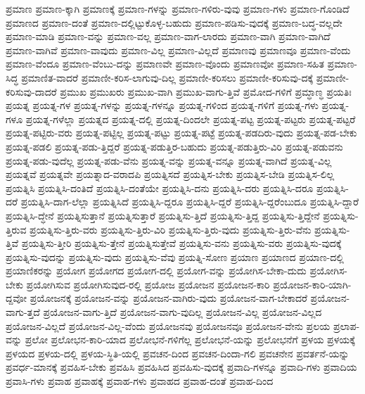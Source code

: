 {ಪ್ರಮಾಣ
ಪ್ರಮಾಣ-ಕ್ಕಾಗಿ
ಪ್ರಮಾಣಕ್ಕೆ
ಪ್ರಮಾಣ-ಗಳನ್ನು
ಪ್ರಮಾಣ-ಗಳಿರು-ವುವು
ಪ್ರಮಾಣ-ಗಳು
ಪ್ರಮಾಣ-ಗೊಂಡಿದೆ
ಪ್ರಮಾಣದ
ಪ್ರಮಾಣ-ದಂತೆ
ಪ್ರಮಾಣ-ದಲ್ಲಿಟ್ಟುಕೊಳ್ಳ-ಬಹುದು
ಪ್ರಮಾಣ-ಪಡಿಸು-ವುದಕ್ಕೆ
ಪ್ರಮಾಣ-ಬದ್ಧ-ವಲ್ಲದೇ
ಪ್ರಮಾಣ-ಮಾಡಿ
ಪ್ರಮಾಣ-ವನ್ನು
ಪ್ರಮಾಣ-ವಲ್ಲ
ಪ್ರಮಾಣ-ವಾಗ-ಲಾರದು
ಪ್ರಮಾಣ-ವಾಗಿ
ಪ್ರಮಾಣ-ವಾಗಿದೆ
ಪ್ರಮಾಣ-ವಾಗಿವೆ
ಪ್ರಮಾಣ-ವಾವುದು
ಪ್ರಮಾಣ-ವಿಲ್ಲ
ಪ್ರಮಾಣ-ವಿಲ್ಲದೆ
ಪ್ರಮಾಣವು
ಪ್ರಮಾಣವೂ
ಪ್ರಮಾಣ-ವೆಂದು
ಪ್ರಮಾಣ-ವೆಂದೂ
ಪ್ರಮಾಣ-ವೆಂಬು-ದನ್ನು
ಪ್ರಮಾಣವೇ
ಪ್ರಮಾಣ-ವೊಂದು
ಪ್ರಮಾಣವೋ
ಪ್ರಮಾಣ-ಸಹಿತ
ಪ್ರಮಾಣ-ಸಿದ್ಧ
ಪ್ರಮಾಣಿತ-ವಾದರೆ
ಪ್ರಮಾಣೀ-ಕರಿಸ-ಲಾಗುವು-ದಿಲ್ಲ
ಪ್ರಮಾಣೀ-ಕರಿಸಲು
ಪ್ರಮಾಣೀ-ಕರಿಸುವು-ದಕ್ಕೆ
ಪ್ರಮಾಣೀ-ಕರಿಸುವು-ದಾದರೆ
ಪ್ರಮುಖ
ಪ್ರಮುಖರು
ಪ್ರಮುಖ-ವಾಗಿ
ಪ್ರಮುಖ-ವಾಗು-ತ್ತಿವೆ
ಪ್ರಮೋದ-ಗಳಿಗೆ
ಪ್ರಮ್ಧಾಣ್ಧ
ಪ್ರಯತಿಃ
ಪ್ರಯತ್ನ
ಪ್ರಯತ್ನ-ಗಳ
ಪ್ರಯತ್ನ-ಗಳನ್ನು
ಪ್ರಯತ್ನ-ಗಳನ್ನೂ
ಪ್ರಯತ್ನ-ಗಳಿಂದ
ಪ್ರಯತ್ನ-ಗಳಿಗೆ
ಪ್ರಯತ್ನ-ಗಳು
ಪ್ರಯತ್ನ-ಗಳೂ
ಪ್ರಯತ್ನ-ಗಳೆಲ್ಲಾ
ಪ್ರಯತ್ನದ
ಪ್ರಯತ್ನ-ದಲ್ಲಿ
ಪ್ರಯತ್ನ-ದಿಂದಲೇ
ಪ್ರಯತ್ನ-ಪಟ್ಟ
ಪ್ರಯತ್ನ-ಪಟ್ಟರು
ಪ್ರಯತ್ನ-ಪಟ್ಟರೆ
ಪ್ರಯತ್ನ-ಪಟ್ಟಿರು-ವರು
ಪ್ರಯತ್ನ-ಪಟ್ಟಿಲ್ಲ
ಪ್ರಯತ್ನ-ಪಟ್ಟು
ಪ್ರಯತ್ನ-ಪಟ್ಟೆ
ಪ್ರಯತ್ನ-ಪಡದಿರು-ವುದು
ಪ್ರಯತ್ನ-ಪಡ-ಬೇಕು
ಪ್ರಯತ್ನ-ಪಡಲಿ
ಪ್ರಯತ್ನ-ಪಡು-ತ್ತಿದ್ದರೆ
ಪ್ರಯತ್ನ-ಪಡುತ್ತಿರ-ಬಹುದು
ಪ್ರಯತ್ನ-ಪಡುತ್ತಿರು-ವಿರಿ
ಪ್ರಯತ್ನ-ಪಡುವನು
ಪ್ರಯತ್ನ-ಪಡು-ವುದೆಲ್ಲ
ಪ್ರಯತ್ನ-ಪಡು-ವೆನು
ಪ್ರಯತ್ನ-ವನ್ನು
ಪ್ರಯತ್ನ-ವನ್ನೂ
ಪ್ರಯತ್ನ-ವಾಗಿದೆ
ಪ್ರಯತ್ನ-ವಿಲ್ಲ
ಪ್ರಯತ್ನವೆ
ಪ್ರಯತ್ನವೇ
ಪ್ರಯತ್ನಾದ-ವರಾದಪಿ
ಪ್ರಯತ್ನಿಸದೆ
ಪ್ರಯತ್ನಿಸ-ಬೇಕು
ಪ್ರಯತ್ನಿಸ-ಬೇಡಿ
ಪ್ರಯತ್ನಿಸ-ಲಿಲ್ಲ
ಪ್ರಯತ್ನಿಸಿ
ಪ್ರಯತ್ನಿಸಿ-ದಂತಿದೆ
ಪ್ರಯತ್ನಿಸಿ-ದಂತೆಯೇ
ಪ್ರಯತ್ನಿಸಿ-ದನು
ಪ್ರಯತ್ನಿಸಿ-ದರು
ಪ್ರಯತ್ನಿಸಿ-ದರೂ
ಪ್ರಯತ್ನಿಸಿ-ದರೆ
ಪ್ರಯತ್ನಿಸಿ-ದಾಗ-ಲೆಲ್ಲಾ
ಪ್ರಯತ್ನಿಸಿದೆ
ಪ್ರಯತ್ನಿಸಿ-ದ್ದರೂ
ಪ್ರಯತ್ನಿಸಿ-ದ್ದರೆ
ಪ್ರಯತ್ನಿಸಿ-ದ್ದರೆಂಬುದೂ
ಪ್ರಯತ್ನಿಸಿ-ದ್ದಾರೆ
ಪ್ರಯತ್ನಿಸಿ-ದ್ಧೇನೆ
ಪ್ರಯತ್ನಿಸುತ್ತಾನೆ
ಪ್ರಯತ್ನಿಸುತ್ತಾರೆ
ಪ್ರಯತ್ನಿಸು-ತ್ತಿದೆ
ಪ್ರಯತ್ನಿಸು-ತ್ತಿದ್ದ
ಪ್ರಯತ್ನಿಸು-ತ್ತಿದ್ದೇನೆ
ಪ್ರಯತ್ನಿಸು-ತ್ತಿರುವ
ಪ್ರಯತ್ನಿಸು-ತ್ತಿರು-ವರು
ಪ್ರಯತ್ನಿಸು-ತ್ತಿರು-ವಿರಿ
ಪ್ರಯತ್ನಿಸು-ತ್ತಿರು-ವುದು
ಪ್ರಯತ್ನಿಸು-ತ್ತಿರು-ವೆನು
ಪ್ರಯತ್ನಿಸು-ತ್ತಿವೆ
ಪ್ರಯತ್ನಿಸು-ತ್ತೀರಿ
ಪ್ರಯತ್ನಿಸು-ತ್ತೇನೆ
ಪ್ರಯತ್ನಿಸುತ್ತೇವೆ
ಪ್ರಯತ್ನಿಸು-ವನು
ಪ್ರಯತ್ನಿಸು-ವರು
ಪ್ರಯತ್ನಿಸು-ವುದಕ್ಕೆ
ಪ್ರಯತ್ನಿಸು-ವುದನ್ನು
ಪ್ರಯತ್ನಿಸು-ವುದು
ಪ್ರಯತ್ನಿಸು-ವೆವು
ಪ್ರಯತ್ನಿ-ಸೋಣ
ಪ್ರಯಾಣ
ಪ್ರಯಾಣದ
ಪ್ರಯಾಣ-ದಲ್ಲಿ
ಪ್ರಯಾಣಿಕರನ್ನು
ಪ್ರಯೋಗ
ಪ್ರಯೋಗದ
ಪ್ರಯೋಗ-ದಲ್ಲಿ
ಪ್ರಯೋಗ-ವನ್ನು
ಪ್ರಯೋಗಿಸ-ಬೇಕಾ-ದುದು
ಪ್ರಯೋಗಿಸ-ಬೇಕು
ಪ್ರಯೋಗಿಸುವ
ಪ್ರಯೋಗಿಸುವುದ-ರಲ್ಲಿ
ಪ್ರಯೋಜ
ಪ್ರಯೋಜನ
ಪ್ರಯೋಜನ-ಕಾರಿ
ಪ್ರಯೋಜನ-ಕಾರಿ-ಯಾಗಿ-ದ್ದವೋ
ಪ್ರಯೋಜನಕ್ಕೆ
ಪ್ರಯೋಜನ-ವನ್ನು
ಪ್ರಯೋಜನ-ವಾಗಿರು-ವುದು
ಪ್ರಯೋಜನ-ವಾಗ-ಬೇಕಾದರೆ
ಪ್ರಯೋಜನ-ವಾಗು-ತ್ತದೆ
ಪ್ರಯೋಜನ-ವಾಗು-ತ್ತಿದೆ
ಪ್ರಯೋಜನ-ವಾಗು-ವುದಿಲ್ಲ
ಪ್ರಯೋಜನ-ವಿಲ್ಲ
ಪ್ರಯೋಜನ-ವಿಲ್ಲದ
ಪ್ರಯೋಜನ-ವಿಲ್ಲದೆ
ಪ್ರಯೋಜನ-ವಿಲ್ಲ-ವೆಂದು
ಪ್ರಯೋಜನವು
ಪ್ರಯೋಜನವೂ
ಪ್ರಯೋಜನ-ವೇನು
ಪ್ರಲಯ
ಪ್ರಲಾಪ-ವನ್ನು
ಪ್ರಲೋ
ಪ್ರಲೋಭನ-ಕಾರಿ-ಯಾದ
ಪ್ರಲೋಭನೆ-ಗಳಿಗೆಲ್ಲ
ಪ್ರಲೋಭನೆ-ಯನ್ನು
ಪ್ರಲೋಭನೆಗೆ
ಪ್ರಳಯ
ಪ್ರಳಯಕ್ಕೆ
ಪ್ರಳಯದ
ಪ್ರಳಯ-ದಲ್ಲಿ
ಪ್ರಳಯ-ಸ್ಥಿತಿ-ಯಲ್ಲಿ
ಪ್ರವಚನ-ದಿಂದ
ಪ್ರವಚನ-ದಿಂದಾ-ಗಲಿ
ಪ್ರವಚನೇನ
ಪ್ರವರ್ತನೆ-ಯನ್ನು
ಪ್ರವರ್ಧ-ಮಾನಕ್ಕೆ
ಪ್ರವಹಿಸ-ಬೇಕು
ಪ್ರವಹಿಸಿ
ಪ್ರವಹಿಸಿದ
ಪ್ರವಹಿಸು-ವುದಕ್ಕೆ
ಪ್ರವಾದಿ-ಗಳನ್ನೂ
ಪ್ರವಾದಿ-ಗಳು
ಪ್ರವಾದಿಯ
ಪ್ರವಾಸಿ-ಗಳು
ಪ್ರವಾಹ
ಪ್ರವಾಹಕ್ಕೆ
ಪ್ರವಾಹ-ಗಳು
ಪ್ರವಾಹದ
ಪ್ರವಾಹ-ದಂತೆ
ಪ್ರವಾಹ-ದಿಂದ
}
